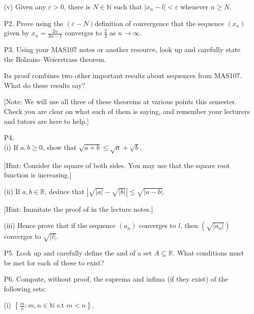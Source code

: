 \documentclass[letterpaper,10pt,english]{jupyterBook}
\begin{document}
\sphinxAtStartPar
(v) Given any \(\varepsilon>0\), there is \(N\in\mathbb{N}\) such that \(|x_n-l|<\varepsilon\) whenever \(n\geq N\).


\label{\detokenize{Problems:p2}}
\sphinxAtStartPar
P2.  Prove using the \((\varepsilon-N)\)\sphinxhyphen{}definition of convergence that the sequence \((x_n)\) given by \(x_n = \frac{2n}{3n-1}\) converges to \(\frac{2}{3}\) as \(n\rightarrow\infty\).


\label{\detokenize{Problems:p3}}
\sphinxAtStartPar
P3.  Using your MAS107 notes or another resource, look up and carefully state the Bolzano–Weierstrass theorem.

Its proof combines two other important results about sequences from MAS107. What do these results say?

{[}Note: We will use all three of these theorems at various points this semester. Check you are clear on what each of them is saying, and remember your lecturers and tutors are here to help.{]}


\label{\detokenize{Problems:p4}}
\sphinxAtStartPar
P4.\\
(i) If \(a, b \geq 0\), show that \(\sqrt{a + b} \leq \sqrt{a} + \sqrt{b}\).

{[}Hint: Consider the square of both sides. You may use that the square root function is increasing.{]}

\sphinxAtStartPar
(ii) If \(a,b \in \mathbb{R}\), deduce that \(\left|\sqrt{|a|} - \sqrt{|b|}\right| \leq \sqrt{|a - b|}\).

{[}Hint: Immitate the proof of  in the lecture notes.{]}

\sphinxAtStartPar
(iii) Hence prove that if the sequence \((a_{n})\) converges to \(l\), then \(\left(\sqrt{|a_{n}|}\right)\) converges to \(\sqrt{|l|}\).


\label{\detokenize{Problems:p5}}
\sphinxAtStartPar
P5. Look up and carefully define the  and  of a set \(A\subseteq\mathbb{R}\). What conditions must be met for each of these to exist?


\label{\detokenize{Problems:p6}}
\sphinxAtStartPar
P6. Compute, without proof, the suprema and infima (if they exist) of the following sets:

\sphinxAtStartPar
(i) \(\left\{\frac{m}{n}:m,n\in\mathbb{N} \text{ s.t } m<n\right\}\).
\end{document}
